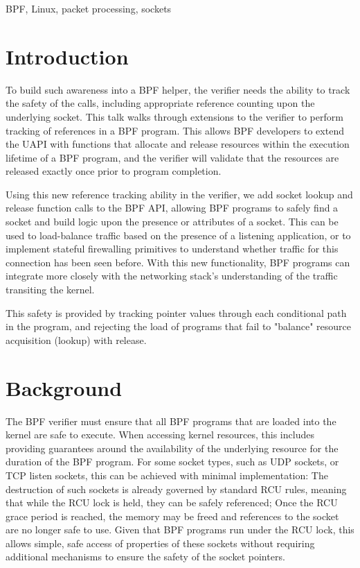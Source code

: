 \documentclass[10pt,sigconf,authorversion]{lpc}
\begin{document}
BPF, Linux, packet processing, sockets

\section{Introduction}


To build such awareness into a BPF helper, the verifier needs the ability to
track the safety of the calls, including appropriate reference counting upon
the underlying socket. This talk walks through extensions to the verifier to
perform tracking of references in a BPF program. This allows BPF developers to
extend the UAPI with functions that allocate and release resources within the
execution lifetime of a BPF program, and the verifier will validate that the
resources are released exactly once prior to program completion.

Using this new reference tracking ability in the verifier, we add socket lookup
and release function calls to the BPF API, allowing BPF programs to safely find
a socket and build logic upon the presence or attributes of a socket. This can
be used to load-balance traffic based on the presence of a listening
application, or to implement stateful firewalling primitives to understand
whether traffic for this connection has been seen before. With this new
functionality, BPF programs can integrate more closely with the networking
stack's understanding of the traffic transiting the kernel.

This safety is provided by tracking pointer values through each conditional
path in the program, and rejecting the load of programs that fail to "balance"
resource acquisition (lookup) with release.

\section{Background}

The BPF verifier must ensure that all BPF programs that are loaded into the
kernel are safe to execute. When accessing kernel resources, this includes
providing guarantees around the availability of the underlying resource for the
duration of the BPF program. For some socket types, such as UDP sockets, or TCP
listen sockets, this can be achieved with minimal implementation: The
destruction of such sockets is already governed by standard RCU rules, meaning
that while the RCU lock is held, they can be safely referenced; Once the RCU
grace period is reached, the memory may be freed and references to the socket
are no longer safe to use. Given that BPF programs run under the RCU lock, this
allows simple, safe access of properties of these sockets without requiring
additional mechanisms to ensure the safety of the socket pointers.
\end{document}
